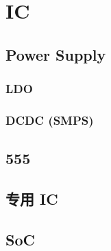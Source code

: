 \chapter{IC}

\section{Power Supply}
\subsection{LDO}
\subsection{DCDC (SMPS)}

\section{555}

\section{专用 IC}

\section{SoC}
